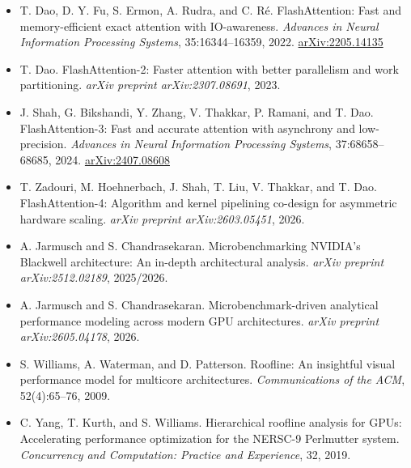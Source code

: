 \documentclass[
  11pt,
]{article}
\providecommand{\tightlist}{%
  \setlength{\itemsep}{0pt}\setlength{\parskip}{0pt}}
\begin{document}
\begin{itemize}
\tightlist
\item
  T. Dao, D. Y. Fu, S. Ermon, A. Rudra, and C. Ré. FlashAttention: Fast
  and memory-efficient exact attention with IO-awareness. \emph{Advances
  in Neural Information Processing Systems}, 35:16344--16359, 2022.
  \href{https://arxiv.org/abs/2205.14135}{arXiv:2205.14135}
\item
  T. Dao. FlashAttention-2: Faster attention with better parallelism and
  work partitioning. \emph{arXiv preprint arXiv:2307.08691}, 2023.
\item
  J. Shah, G. Bikshandi, Y. Zhang, V. Thakkar, P. Ramani, and T. Dao.
  FlashAttention-3: Fast and accurate attention with asynchrony and
  low-precision. \emph{Advances in Neural Information Processing
  Systems}, 37:68658--68685, 2024.
  \href{https://arxiv.org/abs/2407.08608}{arXiv:2407.08608}
\item
  T. Zadouri, M. Hoehnerbach, J. Shah, T. Liu, V. Thakkar, and T. Dao.
  FlashAttention-4: Algorithm and kernel pipelining co-design for
  asymmetric hardware scaling. \emph{arXiv preprint arXiv:2603.05451},
  2026.
\item
  A. Jarmusch and S. Chandrasekaran. Microbenchmarking NVIDIA's
  Blackwell architecture: An in-depth architectural analysis.
  \emph{arXiv preprint arXiv:2512.02189}, 2025/2026.
\item
  A. Jarmusch and S. Chandrasekaran. Microbenchmark-driven analytical
  performance modeling across modern GPU architectures. \emph{arXiv
  preprint arXiv:2605.04178}, 2026.
\item
  S. Williams, A. Waterman, and D. Patterson. Roofline: An insightful
  visual performance model for multicore architectures.
  \emph{Communications of the ACM}, 52(4):65--76, 2009.
\item
  C. Yang, T. Kurth, and S. Williams. Hierarchical roofline analysis for
  GPUs: Accelerating performance optimization for the NERSC-9 Perlmutter
  system. \emph{Concurrency and Computation: Practice and Experience},
  32, 2019.
\end{itemize}
\end{document}
